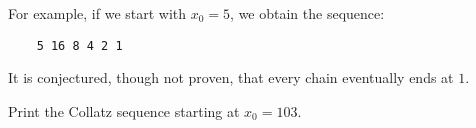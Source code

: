 \begin{questions}
For example, if we start with $x_0 = 5$, we obtain the sequence:
\begin{verbatim}
    5 16 8 4 2 1
\end{verbatim}

It is conjectured, though not proven, that every chain eventually ends at $1$.

Print the Collatz sequence starting at $x_0 = 103$.

\end{questions}




